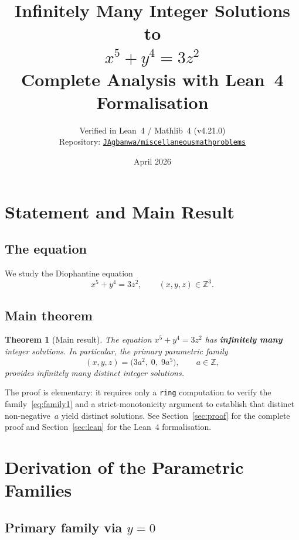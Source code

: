 \documentclass[12pt,a4paper]{article}
\title{%
  \Large\bfseries Infinitely Many Integer Solutions to\\[6pt]
  \Huge $x^5 + y^4 = 3z^2$\\[10pt]
  \large Complete Analysis with Lean~4 Formalisation
}
\author{%
  \normalsize Verified in Lean~4 / Mathlib~4 (v4.21.0)\\[2pt]
  \normalsize Repository: \href{https://github.com/JAgbanwa/miscellaneousmathproblems}%
    {\texttt{JAgbanwa/miscellaneousmathproblems}}
}
\date{\normalsize April 2026}
\newtheorem{theorem}{Theorem}[section]
\theoremstyle{definition}
\newcommand{\Z}{\mathbb{Z}}
\begin{document}
\maketitle
\tableofcontents
\newpage

\section{Statement and Main Result}\label{sec:intro}

\subsection{The equation}

We study the Diophantine equation
\begin{equation}\label{eq:main}
  x^5 + y^4 = 3z^2, \qquad (x,y,z)\in\Z^3. \tag{$\star$}
\end{equation}

\subsection{Main theorem}

\begin{theorem}[Main result]\label{thm:main}
  The equation $x^5 + y^4 = 3z^2$ has \textbf{infinitely many} integer solutions.
  In particular, the primary parametric family
  \begin{equation}\label{eq:family1}
    (x, y, z) = \bigl(3a^2,\; 0,\; 9a^5\bigr), \qquad a \in \Z,
  \end{equation}
  provides infinitely many distinct integer solutions.
\end{theorem}

The proof is elementary: it requires only a \texttt{ring} computation to verify
the family~\eqref{eq:family1} and a strict-monotonicity argument to establish
that distinct non-negative~$a$ yield distinct solutions.
See Section~\ref{sec:proof} for the complete proof and Section~\ref{sec:lean}
for the Lean~4 formalisation.

\section{Derivation of the Parametric Families}\label{sec:derivation}

\subsection{Primary family via $y = 0$}\label{sec:primary}
\end{document}
